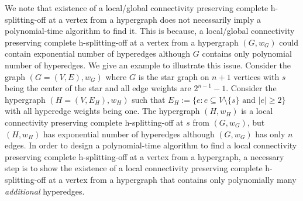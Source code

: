 
\begin{remark}\label{remark:exp-sized-conn-preserving-splitting-off}
We note that existence of a local/global connectivity preserving complete h-splitting-off at a vertex from a hypergraph does not necessarily imply a polynomial-time algorithm to find it. 
This is because, 
a local/global connectivity preserving complete h-splitting-off at a vertex from a hypergraph $(G, w_G)$ could contain exponential number of hyperedges although $G$ contains only polynomial number of hyperedges. 
We give an example to illustrate this issue. 
Consider the graph $(G=(V, E), w_G)$ where $G$ is the star graph on $n+1$ vertices with $s$ being the center of the star and all edge weights are $2^{n-1}-1$. 
Consider the hypergraph $(H=(V, E_H), w_H)$ such that 
$E_H:=\{e: e\subseteq V\setminus \{s\} \text{ and } |e|\ge 2\}$ 
with all hyperedge weights being one. 
The hypergraph $(H, w_H)$ is a local connectivity preserving complete h-splitting-off at $s$ from $(G, w_G)$, but $(H, w_H)$ has exponential number of hyperedges although $(G, w_G)$ has only $n$ edges. 
In order to design a polynomial-time algorithm to find a local connectivity preserving complete h-splitting-off at a vertex from a hypergraph, a necessary step is to show the existence of a local connectivity preserving complete h-splitting-off at a vertex from a hypergraph that contains only polynomially many \emph{additional} hyperedges. 

\end{remark}
